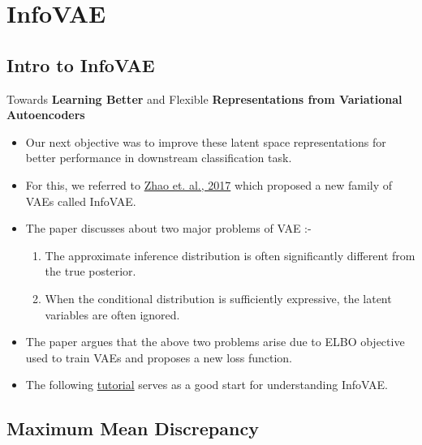 \documentclass[hyperref={colorlinks,citecolor=blue,linkcolor=blue,urlcolor=blue}]{beamer}
\begin{document}
\section{InfoVAE}
\subsection{Intro to InfoVAE}

\begin{frame}{ Towards \textbf{Learning Better} and Flexible \textbf{Representations from Variational Autoencoders} \vspace{0.3em}}
  \begin{itemize}
    \item Our next objective was to improve these latent space representations for better performance in downstream classification task.
    \item For this, we referred to \href{https://arxiv.org/pdf/1706.02262.pdf}{Zhao et. al., 2017} which proposed a new family of VAEs called InfoVAE.
    \item The paper discusses about two major problems of VAE :- 
    \begin{enumerate}
      \item The approximate inference distribution is often significantly different from the true posterior.
      \item When the conditional distribution is sufficiently expressive, the latent variables are often ignored.
    \end{enumerate}
    \item The paper argues that the above two problems arise due to ELBO objective used to train VAEs and proposes a new loss function.
    \item The following \href{https://ermongroup.github.io/blog/a-tutorial-on-mmd-variational-autoencoders/}{tutorial} serves as a good start for understanding InfoVAE. 
  \end{itemize}
\end{frame}

\subsection{Maximum Mean Discrepancy}
\end{document}
